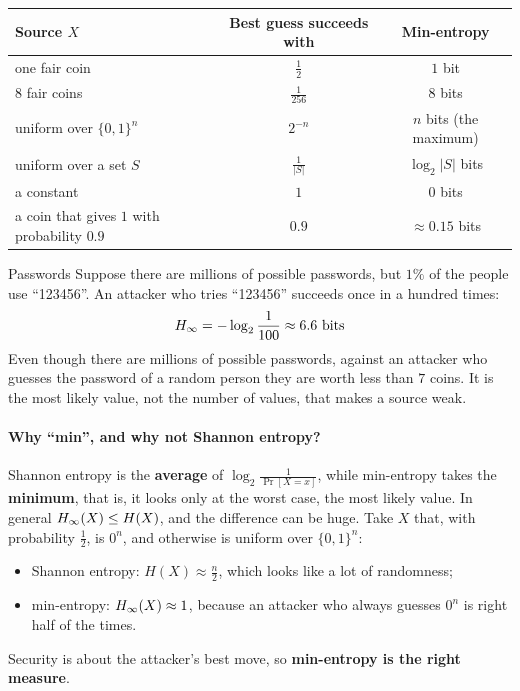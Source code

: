 \begin{table}[H]
  \centering
  \small
  \begin{tabular}{lcc}
    \toprule
    \textbf{Source $X$} & \textbf{Best guess succeeds with} & \textbf{Min-entropy} \\
    \midrule
    one fair coin & $\frac{1}{2}$ & $1$ bit \\
    $8$ fair coins & $\frac{1}{256}$ & $8$ bits \\
    uniform over $\{0,1\}^n$ & $2^{-n}$ & $n$ bits (the maximum) \\
    uniform over a set $S$ & $\frac{1}{|S|}$ & $\log_2 |S|$ bits \\
    a constant & $1$ & $0$ bits \\
    a coin that gives $1$ with probability $0.9$ & $0.9$ & $\approx 0.15$ bits \\
    \bottomrule
  \end{tabular}
\end{table}

\begin{framedex}{Passwords}
  Suppose there are millions of possible passwords, but $1\%$ of the people use ``123456''. An attacker who tries ``123456'' succeeds once in a hundred times:
  \[
    H_\infty = -\log_2 \frac{1}{100} \approx 6.6 \text{ bits}
  \]
  Even though there are millions of possible passwords, against an attacker who guesses the password of a random person they are worth less than $7$ coins. It is the most likely value, not the number of values, that makes a source weak.
\end{framedex}

\paragraph{Why ``min'', and why not Shannon entropy?} Shannon entropy is the \textbf{average} of $\log_2 \frac{1}{\Pr[X = x]}$, while min-entropy takes the \textbf{minimum}, that is, it looks only at the worst case, the most likely value. In general $H_\infty(X) \leq H(X)$, and the difference can be huge. Take $X$ that, with probability $\frac{1}{2}$, is $0^n$, and otherwise is uniform over $\{0,1\}^n$:
\begin{itemize}
  \item Shannon entropy: $H(X) \approx \frac{n}{2}$, which looks like a lot of randomness;
  \item min-entropy: $H_\infty(X) \approx 1$, because an attacker who always guesses $0^n$ is right half of the times.
\end{itemize}
Security is about the attacker's best move, so \textbf{min-entropy is the right measure}.

